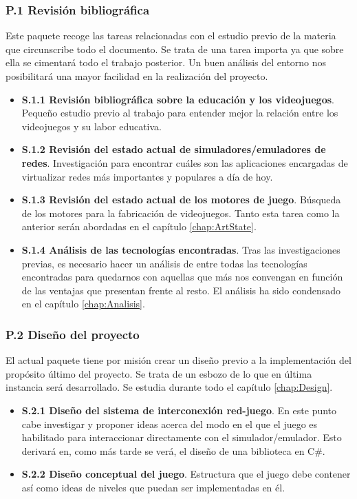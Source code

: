 \subsubsection{P.1 Revisión bibliográfica}
Este paquete recoge las tareas relacionadas con el estudio previo de la materia que circunscribe todo el documento. Se trata de una tarea importa ya que sobre ella se cimentará todo el trabajo posterior. Un buen análisis del entorno nos posibilitará una mayor facilidad en la realización del proyecto.
\begin{itemize}
\item \textbf{S.1.1 Revisión bibliográfica sobre la educación y los videojuegos}. Pequeño estudio previo al trabajo para entender mejor la relación entre los videojuegos y su labor educativa.
\item \textbf{S.1.2 Revisión del estado actual de simuladores/emuladores de redes}. Investigación para encontrar cuáles son las aplicaciones encargadas de virtualizar redes más importantes y populares a día de hoy.
\item \textbf{S.1.3 Revisión del estado actual de los motores de juego}. Búsqueda de los motores para la fabricación de videojuegos. Tanto esta tarea como la anterior serán abordadas en el capítulo \ref{chap:ArtState}.
\item \textbf{S.1.4 Análisis de las tecnologías encontradas}. Tras las investigaciones previas, es necesario hacer un análisis de entre todas las tecnologías encontradas para quedarnos con aquellas que más nos convengan en función de las ventajas que presentan frente al resto. El análisis ha sido condensado en el capítulo \ref{chap:Analisis}.
\end{itemize}

\subsubsection{P.2 Diseño del proyecto}
El actual paquete tiene por misión crear un diseño previo a la implementación del propósito último del proyecto. Se trata de un esbozo de lo que en última instancia será desarrollado. Se estudia durante todo el capítulo \ref{chap:Design}.
\begin{itemize}
\item \textbf{S.2.1 Diseño del sistema de interconexión red-juego}. En este punto cabe investigar y proponer ideas acerca del modo en el que el juego es habilitado para interaccionar directamente con el simulador/emulador. Esto derivará en, como más tarde se verá, el diseño de una biblioteca en C\#.
\item \textbf{S.2.2 Diseño conceptual del juego}. Estructura que el juego debe contener así como ideas de niveles que puedan ser implementadas en él.
\end{itemize}

